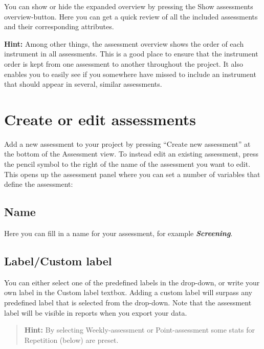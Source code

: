 \documentclass[]{book}
\begin{document}
You can show or hide the expanded overview by pressing the Show assessments overview-button. Here you can get a quick review of all the included assessments and their corresponding attributes.

\textbf{Hint:} Among other things, the assessment overview shows the order of each instrument in all assessments. This is a good place to ensure that the instrument order is kept from one assessment to another throughout the project. It also enables you to easily see if you somewhere have missed to include an instrument that should appear in several, similar assessments.

\hypertarget{create-or-edit-assessments}{%
\section{Create or edit assessments}\label{create-or-edit-assessments}}

Add a new assessment to your project by pressing ``Create new assessment'' at the bottom of the Assessment view. To instead edit an existing assessment, press the pencil symbol to the right of the name of the assessment you want to edit. This opens up the assessment panel where you can set a number of variables that define the assessment:

\hypertarget{name}{%
\subsection{Name}\label{name}}

Here you can fill in a name for your assessment, for example \textbf{\emph{Screening}}.

\hypertarget{labelcustom-label}{%
\subsection{Label/Custom label}\label{labelcustom-label}}

You can either select one of the predefined labels in the drop-down, or write your own label in the Custom label textbox. Adding a custom label will surpass any predefined label that is selected from the drop-down. Note that the assessment label will be visible in reports when you export your data.

\begin{quote}
\textbf{Hint:} By selecting Weekly-assessment or Point-assessment some stats for Repetition (below) are preset.
\end{quote}
\end{document}
